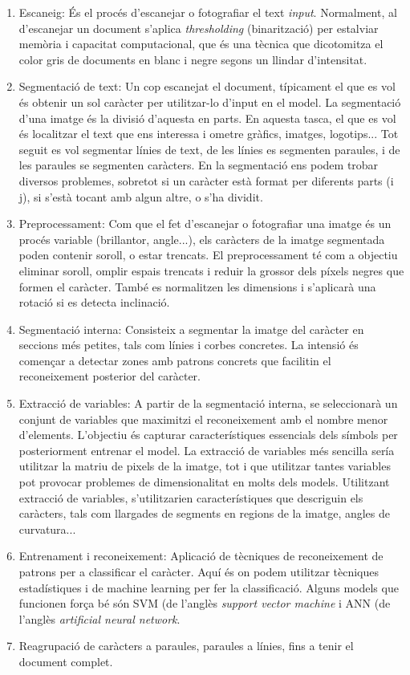 \documentclass[12pt, spanish]{article}
\begin{document}
\begin{enumerate}
\item Escaneig: És el procés d'escanejar o fotografiar el text \textit{input}. Normalment, al d'escanejar un document s'aplica \textit{thresholding} (binarització) per estalviar memòria i capacitat computacional, que és una tècnica que dicotomitza el color gris de documents en blanc i negre segons un llindar d'intensitat.

\item Segmentació de text: Un cop escanejat el document, típicament el que es vol és obtenir un sol caràcter per utilitzar-lo d'input en el model. La segmentació d'una imatge és la divisió d'aquesta en parts. En aquesta tasca, el que es vol és localitzar el text que ens interessa i ometre gràfics, imatges, logotips... Tot seguit es vol segmentar línies de text, de les línies es segmenten paraules, i de les paraules se segmenten caràcters. En la segmentació ens podem trobar diversos problemes, sobretot si un caràcter està format per diferents parts (i j), si s'està tocant amb algun altre, o s'ha dividit.

\item Preprocessament: Com que el fet d'escanejar o fotografiar una imatge és un procés variable (brillantor, angle...), els caràcters de la imatge segmentada poden contenir soroll, o estar trencats. El preprocessament té com a objectiu eliminar soroll, omplir espais trencats i reduir la grossor dels píxels negres que formen el caràcter. També es normalitzen les dimensions i s'aplicarà una rotació si es detecta inclinació.

\item Segmentació interna: Consisteix a segmentar la imatge del caràcter en seccions més petites, tals com línies i corbes concretes. La intensió és començar a detectar zones amb patrons concrets que facilitin el reconeixement posterior del caràcter.

\item Extracció de variables: A partir de la segmentació interna, se seleccionarà un conjunt de variables que maximitzi el reconeixement amb el nombre menor d'elements. L'objectiu és capturar característiques essencials dels símbols per posteriorment entrenar el model. La extracció de variables més sencilla sería utilitzar la matriu de pixels de la imatge, tot i que utilitzar tantes variables pot provocar problemes de dimensionalitat en molts dels models. Utilitzant extracció de variables, s'utilitzarien característiques que descriguin els caràcters, tals com llargades de segments en regions de la imatge, angles de curvatura...

\item Entrenament i reconeixement: Aplicació de tècniques de reconeixement de patrons per a classificar el caràcter. Aquí és on podem utilitzar tècniques estadístiques i de machine learning per fer la classificació. Alguns models que funcionen força bé són SVM (de l'anglès \textit{support vector machine} i ANN (de l'anglès \textit{artificial neural network}.

\item Reagrupació de caràcters a paraules, paraules a línies, fins a tenir el document complet.
\end{enumerate}
\end{document}
